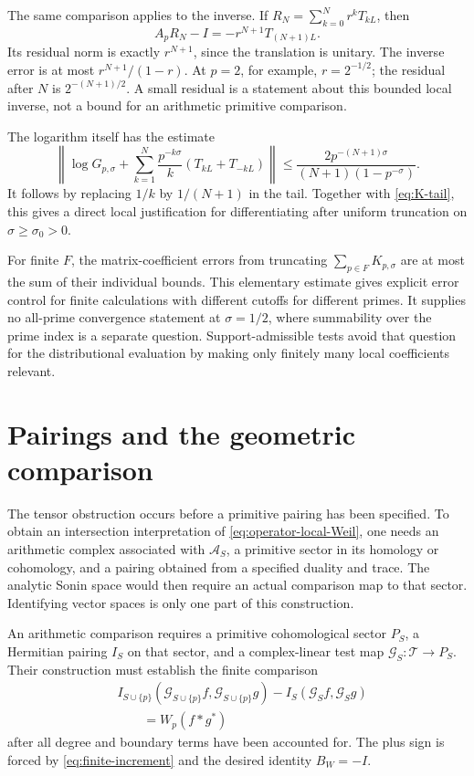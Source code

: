 \documentclass[11pt,letterpaper]{article}
\theoremstyle{definition}
\theoremstyle{remark}
\newcommand{\T}{\mathcal T}
\begin{document}
The same comparison applies to the inverse. If
$R_N=\sum_{k=0}^Nr^kT_{kL}$, then
\begin{equation}\label{eq:inverse-residual}
 A_pR_N-I=-r^{N+1}T_{(N+1)L}.
\end{equation}
Its residual norm is exactly $r^{N+1}$, since the
translation is unitary. The inverse error is at most
$r^{N+1}/(1-r)$. At $p=2$, for example, $r=2^{-1/2}$;
the residual after $N$ is $2^{-(N+1)/2}$. A small
residual is a statement about this bounded local
inverse, not a bound for an arithmetic primitive
comparison.

The logarithm itself has the estimate
\begin{equation}\label{eq:log-tail}
 \left\|\log G_{p,\sigma}
 +\sum_{k=1}^N\frac{p^{-k\sigma}}k(T_{kL}+T_{-kL})\right\|
 \le\frac{2p^{-(N+1)\sigma}}{(N+1)(1-p^{-\sigma})}.
\end{equation}
It follows by replacing $1/k$ by $1/(N+1)$ in the
tail. Together with \eqref{eq:K-tail}, this gives a
direct local justification for differentiating after
uniform truncation on $\sigma\ge\sigma_0>0$.

For finite $F$, the matrix-coefficient errors from
truncating $\sum_{p\in F}K_{p,\sigma}$ are at most
the sum of their individual bounds. This elementary
estimate gives explicit error control for finite calculations with
different cutoffs for different primes. It supplies
no all-prime convergence statement at $\sigma=1/2$,
where summability over the prime index is a separate
question. Support-admissible tests avoid that question
for the distributional evaluation by making only
finitely many local coefficients relevant.

\section{Pairings and the geometric comparison}

The tensor obstruction occurs before a primitive pairing has been
specified. To obtain an intersection interpretation of
\eqref{eq:operator-local-Weil}, one needs an arithmetic complex
associated with $\mathcal A_S$, a primitive sector in its homology
or cohomology, and a pairing obtained from a specified duality and
trace. The analytic Sonin space would then require an actual
comparison map to that sector. Identifying vector spaces is only
one part of this construction.

An arithmetic comparison requires a primitive cohomological sector
$P_S$, a Hermitian pairing $I_S$ on that sector, and a complex-linear
test map $\mathcal G_S:\T\to P_S$. Their construction must establish
the finite comparison
\begin{equation}\label{eq:geometric-target}
 \begin{aligned}
 &I_{S\cup\{p\}}(\mathcal G_{S\cup\{p\}}f,\mathcal G_{S\cup\{p\}}g)
 -I_S(\mathcal G_Sf,\mathcal G_Sg)\\
 &\qquad=W_p(f*g^*)
 \end{aligned}
\end{equation}
after all degree and boundary terms have been accounted for.
The plus sign is forced by \eqref{eq:finite-increment} and the
desired identity $B_W=-I$.
\end{document}
